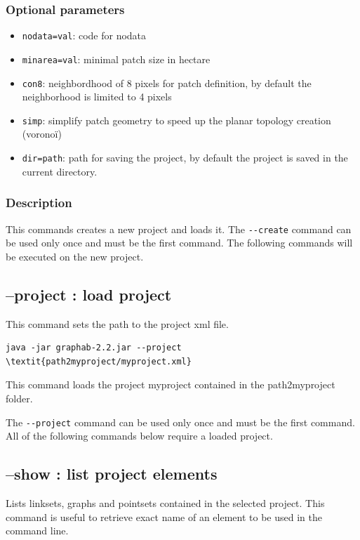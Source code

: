 \documentclass[a4paper,10pt]{report}
\begin{document}
\subsubsection{Optional parameters}
\begin{itemize}
	\item \verb|nodata=val|: code for nodata
	\item \verb|minarea=val|: minimal patch size in hectare
	\item \verb|con8|: neighbordhood of 8 pixels for patch definition, by default the neighborhood is limited to 4 pixels
	\item \verb|simp|: simplify patch geometry to speed up the planar topology creation (voronoï)
	\item \verb|dir=path|: path for saving the project, by default the project is saved in the current directory.
\end{itemize}

\subsubsection{Description}
This commands creates a new project and loads it.
The \verb|--create| command can be used only once and must be the first command.
The following commands will be executed on the new project.

\subsection{--project : load project}
This command sets the path to the project xml file.
\begin{Verbatim}[commandchars=\\\{\}]
java -jar graphab-2.2.jar --project \textit{path2myproject/myproject.xml}
\end{Verbatim}
This command loads the project myproject contained in the path2myproject folder.

The \verb|--project| command can be used only once and must be the first command.
All of the following commands below require a loaded project. 

\subsection{--show : list project elements}
Lists linksets, graphs and pointsets contained in the selected project. This command is useful to retrieve exact name of an element to be used in the command line.
\end{document}
